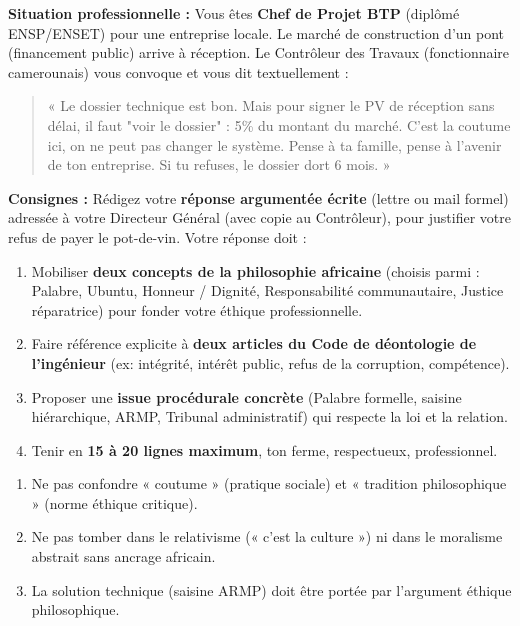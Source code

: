 \documentclass[11pt]{article}
\newcommand{\cle}[1]{{\popxbold\color{popdark}#1}}
\begin{document}
\begin{exercice}
\textbf{Situation professionnelle :}
Vous êtes \textbf{Chef de Projet BTP} (diplômé ENSP/ENSET) pour une entreprise locale. Le marché de construction d'un pont (financement public) arrive à réception. Le Contrôleur des Travaux (fonctionnaire camerounais) vous convoque et vous dit textuellement : 
\begin{quote}
« Le dossier technique est bon. Mais pour signer le PV de réception sans délai, il faut "voir le dossier" : 5\% du montant du marché. C'est la coutume ici, on ne peut pas changer le système. Pense à ta famille, pense à l'avenir de ton entreprise. Si tu refuses, le dossier dort 6 mois. »
\end{quote}

\textbf{Consignes :}
Rédigez votre \textbf{réponse argumentée écrite} (lettre ou mail formel) adressée à votre Directeur Général (avec copie au Contrôleur), pour justifier votre refus de payer le pot-de-vin. Votre réponse doit :
\begin{enumerate}
    \item Mobiliser \textbf{deux concepts de la philosophie africaine} (choisis parmi : \cle{Palabre}, \cle{Ubuntu}, \cle{Honneur / Dignité}, \cle{Responsabilité communautaire}, \cle{Justice réparatrice}) pour fonder votre éthique professionnelle.
    \item Faire référence explicite à \textbf{deux articles du Code de déontologie de l'ingénieur} (ex: intégrité, intérêt public, refus de la corruption, compétence).
    \item Proposer une \textbf{issue procédurale concrète} (Palabre formelle, saisine hiérarchique, ARMP, Tribunal administratif) qui respecte la loi et la relation.
    \item Tenir en \textbf{15 à 20 lignes maximum}, ton ferme, respectueux, professionnel.
\end{enumerate}
\begin{attention}
\begin{enumerate}
\item Ne pas confondre « coutume » (pratique sociale) et « tradition philosophique » (norme éthique critique).
\item Ne pas tomber dans le relativisme (« c'est la culture ») ni dans le moralisme abstrait sans ancrage africain.
\item La solution technique (saisine ARMP) doit être portée par l'argument éthique philosophique.
\end{enumerate}
\end{attention}
\end{exercice}
\end{document}
